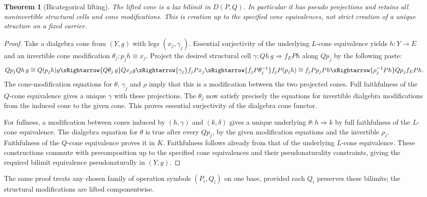 \documentclass{article}
\newtheorem{theorem}{Theorem}\newtheorem{lemma}{Lemma}
\begin{document}
\begin{theorem}[Bicategorical lifting]
The lifted cone is a lax bilimit in $D(P,Q)$. In particular it has pseudo projections and retains all noninvertible structural cells and cone modifications. This is creation up to the specified cone equivalences, not strict creation of a unique structure on a fixed carrier.
\end{theorem}
\begin{proof}
Take a dialgebra cone from $(Y,g)$ with legs $(x_j,\gamma_j)$. Essential surjectivity of the underlying $L$-cone equivalence yields $h:Y\to E$ and an invertible cone modification $\theta_j:p_jh\cong x_j$. Project the desired structural cell $\gamma:Qh\,g\Rightarrow f_EPh$ along $Qp_j$ by the following paste:
\[
Qp_jQh\,g\cong Q(p_jh)g
\xRightarrow{Q\theta_j\,g}Qx_jg
\xRightarrow{\gamma_j}f_jPx_j
\xRightarrow{f_jP\theta_j^{-1}}f_jP(p_jh)
\cong f_jPp_jPh
\xRightarrow{\rho_j^{-1}Ph}Qp_jf_EPh.
\]
The cone-modification equations for $\theta$, $\gamma_j$ and $\rho$ imply that this is a modification between the two projected cones. Full faithfulness of the $Q$-cone equivalence gives a unique $\gamma$ with these projections. The $\theta_j$ now satisfy precisely the equations for invertible dialgebra modifications from the induced cone to the given cone. This proves essential surjectivity of the dialgebra cone functor.

For fullness, a modification between cones induced by $(h,\gamma)$ and $(k,\delta)$ gives a unique underlying $\theta:h\Rightarrow k$ by full faithfulness of the $L$-cone equivalence. The dialgebra equation for $\theta$ is true after every $Qp_j$, by the given modification equations and the invertible $\rho_j$. Faithfulness of the $Q$-cone equivalence proves it in $K$. Faithfulness follows already from that of the underlying $L$-cone equivalence. These constructions commute with precomposition up to the specified cone equivalences and their pseudonaturality constraints, giving the required bilimit equivalence pseudonaturally in $(Y,g)$.
\end{proof}
The same proof treats any chosen family of operation symbols $(P_i,Q_i)$ on one base, provided each $Q_i$ preserves these bilimits; the structural modifications are lifted componentwise.
\end{document}
